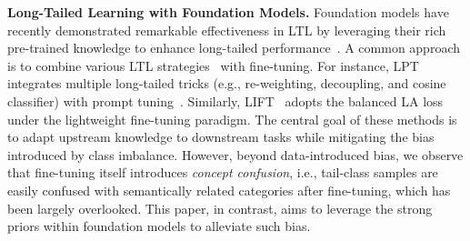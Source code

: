 \noindent \textbf{Long-Tailed Learning with Foundation Models.}
Foundation models have recently demonstrated remarkable effectiveness in LTL by leveraging their rich pre-trained knowledge to enhance long-tailed performance~\cite{tian2022vl, dong2023lpt, wang2024exploring, shi2025lift+,zhang2024long,luo2025long,lt2026hong}. A common approach is to combine various LTL strategies~\cite{cui2019class,zhang2021distribution, menon2021longtail,hong2021disentangling,shi2023re} with fine-tuning. For instance, LPT~\cite{dong2023lpt} integrates multiple long-tailed tricks (e.g., re-weighting, decoupling, and cosine classifier) with prompt tuning~\cite{jia2022visual}. Similarly, LIFT~\cite{shi2024long} adopts the balanced LA loss~\cite{menon2021longtail} under the lightweight fine-tuning paradigm. The central goal of these methods is to adapt upstream knowledge to downstream tasks while mitigating the bias introduced by class imbalance. However, beyond data-introduced bias, we observe that fine-tuning itself introduces \textit{concept confusion}, i.e., tail-class samples are easily confused with semantically related categories after fine-tuning, which has been largely overlooked. This paper, in contrast, aims to leverage the strong priors within foundation models to alleviate such bias.

